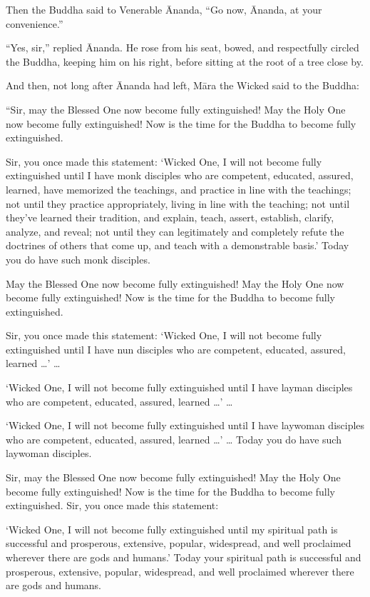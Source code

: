 \documentclass[12pt,openany]{book}%
\begin{document}
Then the Buddha said to Venerable Ānanda, “Go now, Ānanda, at your convenience.” 

“Yes, sir,” replied Ānanda. He rose from his seat, bowed, and respectfully circled the Buddha, keeping him on his right, before sitting at the root of a tree close by. 

And then, not long after Ānanda had left, \textsanskrit{Māra} the Wicked said to the Buddha: 

“Sir, may the Blessed One now become fully extinguished! May the Holy One now become fully extinguished! Now is the time for the Buddha to become fully extinguished. 

Sir, you once made this statement: ‘Wicked One, I will not become fully extinguished until I have monk disciples who are competent, educated, assured, learned, have memorized the teachings, and practice in line with the teachings; not until they practice appropriately, living in line with the teaching; not until they’ve learned their tradition, and explain, teach, assert, establish, clarify, analyze, and reveal; not until they can legitimately and completely refute the doctrines of others that come up, and teach with a demonstrable basis.’ Today you do have such monk disciples. 

May the Blessed One now become fully extinguished! May the Holy One now become fully extinguished! Now is the time for the Buddha to become fully extinguished. 

Sir, you once made this statement: ‘Wicked One, I will not become fully extinguished until I have nun disciples who are competent, educated, assured, learned …’ … 

‘Wicked One, I will not become fully extinguished until I have layman disciples who are competent, educated, assured, learned …’ … 

‘Wicked One, I will not become fully extinguished until I have laywoman disciples who are competent, educated, assured, learned …’ … Today you do have such laywoman disciples. 

Sir, may the Blessed One now become fully extinguished! May the Holy One become fully extinguished! Now is the time for the Buddha to become fully extinguished. Sir, you once made this statement: 

‘Wicked One, I will not become fully extinguished until my spiritual path is successful and prosperous, extensive, popular, widespread, and well proclaimed wherever there are gods and humans.’ Today your spiritual path is successful and prosperous, extensive, popular, widespread, and well proclaimed wherever there are gods and humans. 
\end{document}

